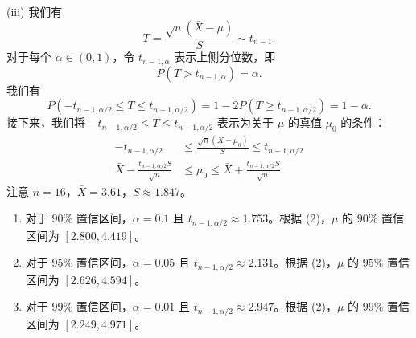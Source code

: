 \begin{questions}
\begin{solution}
(iii) 我们有
\[
T = \frac{\sqrt{n}(\bar{X} - \mu)}{S} \sim t_{n-1}.
\]
对于每个 $\alpha \in (0, 1)$，令 $t_{n-1, \alpha}$ 表示上侧分位数，即
\[
P(T > t_{n-1, \alpha}) = \alpha.
\]
我们有
\[
P(-t_{n-1, \alpha/2} \le T \le t_{n-1, \alpha/2}) = 1 - 2P(T \ge t_{n-1, \alpha/2}) = 1 - \alpha.
\]
接下来，我们将 $-t_{n-1, \alpha/2} \le T \le t_{n-1, \alpha/2}$ 表示为关于 $\mu$ 的真值 $\mu_0$ 的条件：
\begin{align*}
-t_{n-1, \alpha/2} &\le \frac{\sqrt{n}(\bar{X} - \mu_0)}{S} \le t_{n-1, \alpha/2} \\
\bar{X} - \frac{t_{n-1, \alpha/2} S}{\sqrt{n}} &\le \mu_0 \le \bar{X} + \frac{t_{n-1, \alpha/2} S}{\sqrt{n}}. \tag{2}
\end{align*}
注意 $n = 16$，$\bar{X} = 3.61$，$S \approx 1.847$。
\begin{enumerate}
    \item 对于 $90\%$ 置信区间，$\alpha = 0.1$ 且 $t_{n-1, \alpha/2} \approx 1.753$。根据 (2)，$\mu$ 的 $90\%$ 置信区间为 $[2.800, 4.419]$。
    \item 对于 $95\%$ 置信区间，$\alpha = 0.05$ 且 $t_{n-1, \alpha/2} \approx 2.131$。根据 (2)，$\mu$ 的 $95\%$ 置信区间为 $[2.626, 4.594]$。
    \item 对于 $99\%$ 置信区间，$\alpha = 0.01$ 且 $t_{n-1, \alpha/2} \approx 2.947$。根据 (2)，$\mu$ 的 $99\%$ 置信区间为 $[2.249, 4.971]$。
\end{enumerate}
\end{solution}


\end{questions}
